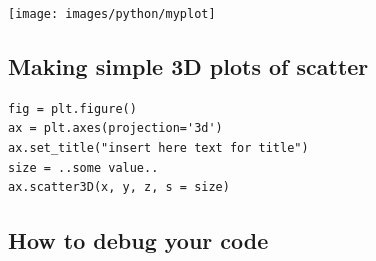 \begin{center}
\texttt{[image: images/python/myplot]}
\end{center}



\subsection{Making simple 3D plots of scatter}

\begin{lstlisting}
fig = plt.figure()
ax = plt.axes(projection='3d')
ax.set_title("insert here text for title")
size = ..some value..
ax.scatter3D(x, y, z, s = size)
\end{lstlisting}




\subsection{How to debug your code}


